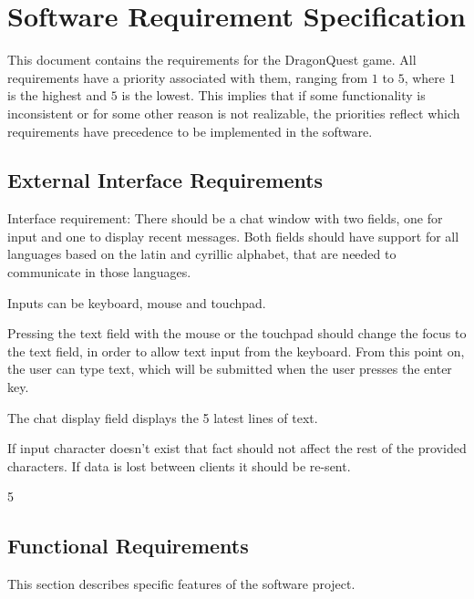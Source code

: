 \section{Software Requirement Specification}
\label{sec:srs}
This document contains the requirements for the DragonQuest game. All requirements have a priority associated with them, ranging from $1$ to $5$, where $1$ is the highest and $5$ is the lowest. This implies that if some functionality is inconsistent or for some other reason is not realizable, the priorities reflect which requirements have precedence to be implemented in the software.

\subsection{External Interface Requirements}


Interface requirement: There should be a chat window with two fields, one for input and one to display recent messages. Both fields should have support for all languages based on the latin and cyrillic alphabet, that are needed to communicate in those languages.

Inputs can be keyboard, mouse and touchpad.

Pressing the text field with the mouse or the touchpad should change the focus to the text field, in order to allow text input from the keyboard. From this point on, the user can type text, which will be submitted when the user presses the enter key. 

The chat display field displays the 5 latest lines of text. 

If input character doesn't exist that fact should not affect the rest of the provided characters. If data is lost between clients it should be re-sent.

5

\stoprequirement

\subsection{Functional Requirements}
This section describes specific features of the software project.

